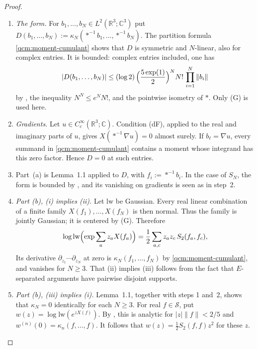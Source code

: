 \documentclass[11pt,letterpaper,reqno]{amsart}
\theoremstyle{definition}
\begin{document}
\begin{proof}
\begin{enumerate}
\item[1.] \emph{The form.}
For $b_1,\dots,b_N\in L^2(\mathbb{R}^3;\mathbb{C}^3)$ put $D(b_1,\dots,b_N):=\kappa_N(\ast^{-1}b_1,\dots,\ast^{-1}b_N)$.
The partition formula \eqref{qcm:moment-cumulant} shows that $D$ is symmetric and $N$-linear, also for complex entries.
It is bounded: complex entries included, one has
\begin{equation*}
|D(b_1,\dots,b_N)|\le(\log2)\,\Bigl(\frac{5\exp(1)}{2}\Bigr)^{N}N!\,\prod_{i=1}^{N}\|b_i\|
\end{equation*}
by \cite[Section~5.2, equation~(5.7)]{QEDConstruction}, the inequality $N^N\le e^N N!$, and the pointwise isometry of $\ast$. Only (G) is used here.
\item[2.] \emph{Gradients.}
Let $u\in C_c^\infty(\mathbb R^3;\mathbb C)$. Condition (dF), applied to the real and imaginary parts of $u$, gives $X(\ast^{-1}\nabla u)=0$ almost surely.
If $b_\ell=\nabla u$, every summand in \eqref{qcm:moment-cumulant} contains a moment whose integrand has this zero factor.
Hence $D=0$ at such entries.
\item[3.]
Part~(a) is Lemma~1.1 applied to $D$, with $f_i:=\ast^{-1}b_i$.
In the case of $S_N$, the form is bounded by \cite[Proposition~5.1]{QEDConstruction}, and its vanishing on gradients is seen as in step~2.
\item[4.] \emph{Part (b), (i) implies (ii).}
Let $\mathrm{lw}$ be Gaussian.
Every real linear combination of a finite family $X(f_1),\ldots,X(f_N)$ is then normal. Thus the family is jointly Gaussian; it is centered by (G).
Therefore
\begin{equation*}
\log\mathrm{lw}\Bigl(\exp\sum_az_aX(f_a)\Bigr)=\frac12\sum_{a,c}z_az_c\,S_2(f_a,f_c),
\end{equation*}
Its derivative $\partial_{z_1}\cdots\partial_{z_N}$ at zero is $\kappa_N(f_1,\ldots,f_N)$ by \eqref{qcm:moment-cumulant}, and vanishes for $N\ge3$.
That (ii) implies (iii) follows from the fact that $E$-separated arguments have pairwise disjoint supports.
\item[5.] \emph{Part (b), (iii) implies (i).}
Lemma~1.1, together with steps 1 and~2, shows that $\kappa_N=0$ identically for each $N\ge3$.
For real $f\in\mathcal S$, put $w(z)=\log\mathrm{lw}(e^{zX(f)})$. By \cite[Section~5.2]{QEDConstruction}, this is analytic for $|z|\|f\|<2/5$ and $w^{(n)}(0)=\kappa_n(f,\ldots,f)$.
It follows that $w(z)=\tfrac12S_2(f,f)z^2$ for these $z$.

\end{enumerate}
\end{proof}
\end{document}
